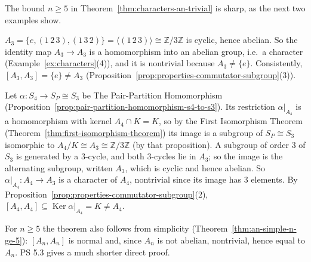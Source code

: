 \documentclass[11pt]{report}
\begin{document}
The bound $n \geq 5$ in Theorem~\ref{thm:characters-an-trivial} is sharp, as the next two examples show.

\begin{exbox}\label{ex:nontrivial-character-a3}
$A_3 = \{e, (1\,2\,3), (1\,3\,2)\} = \langle (1\,2\,3) \rangle \cong \mathbb{Z}/3\mathbb{Z}$ is cyclic, hence abelian. So the identity map $A_3 \to A_3$ is a homomorphism into an abelian group, i.e.\ a character (Example~\ref{ex:characters}(4)), and it is nontrivial because $A_3 \neq \{e\}$. Consistently, $[A_3, A_3] = \{e\} \neq A_3$ (Proposition~\ref{prop:properties-commutator-subgroup}(3)).
\end{exbox}

\begin{exbox}\label{ex:nontrivial-character-a4}
Let $\alpha: S_4 \to S_P \cong S_3$ be The Pair-Partition Homomorphism (Proposition~\ref{prop:pair-partition-homomorphism-s4-to-s3}). Its restriction $\alpha|_{A_4}$ is a homomorphism with kernel $A_4 \cap K = K$, so by the First Isomorphism Theorem (Theorem~\ref{thm:first-isomorphism-theorem}) its image is a subgroup of $S_P \cong S_3$ isomorphic to $A_4/K \cong A_3 \cong \mathbb{Z}/3\mathbb{Z}$ (by that proposition). A subgroup of order $3$ of $S_3$ is generated by a $3$-cycle, and both $3$-cycles lie in $A_3$; so the image is the alternating subgroup, written $A_3$, which is cyclic and hence abelian. So $\alpha|_{A_4}: A_4 \to A_3$ is a character of $A_4$, nontrivial since its image has $3$ elements. By Proposition~\ref{prop:properties-commutator-subgroup}(2), $[A_4, A_4] \subseteq \operatorname{Ker}\alpha|_{A_4} = K \neq A_4$.
\end{exbox}

\begin{rembox}\label{rem:small-n-simplicity}
For $n \geq 5$ the theorem also follows from simplicity (Theorem~\ref{thm:an-simple-n-ge-5}): $[A_n, A_n]$ is normal and, since $A_n$ is not abelian, nontrivial, hence equal to $A_n$. PS 5.3 gives a much shorter direct proof.
\end{rembox}
\end{document}
